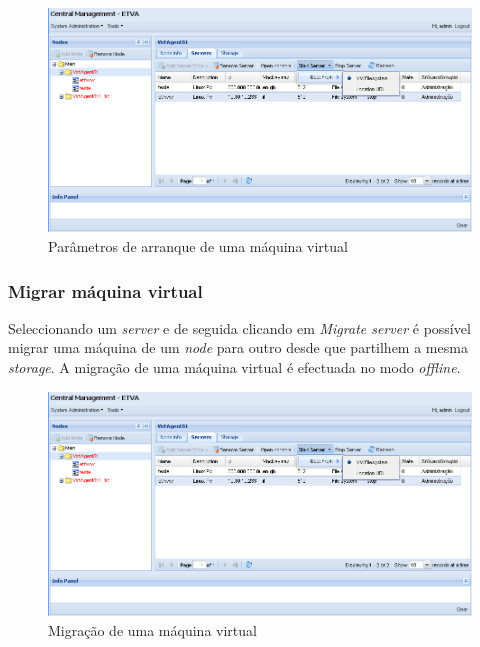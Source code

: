 \begin{figure}[H]
	\begin{center}
	\includegraphics[scale=0.5]{screenshots/server_start.png}
	\caption{Parâmetros de arranque de uma máquina virtual}
	\label{fig:server_start}
	\end{center}
\end{figure}


\subsubsection{Migrar máquina virtual}
\label{sec:migrate_server}

Seleccionando um \emph{server} e de seguida clicando em \emph{Migrate server} é possível migrar uma máquina de um \emph{node} para outro desde que partilhem a mesma \emph{storage}.
A migração de uma máquina virtual é efectuada no modo \emph{offline}.

\begin{figure}[H]
	\begin{center}
	\includegraphics[scale=0.5]{screenshots/server_start.png}
	\caption{Migração de uma máquina virtual}
	\label{fig:server_migrate}
	\end{center}
\end{figure}


